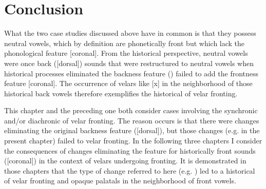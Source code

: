 \section{{Conclusion}}\label{sec:6.6}

What the two case studies discussed above have in common is that they possess neutral vowels, which by definition are phonetically front but which lack the phonological feature [coronal].  From the historical perspective, neutral vowels were once back ([dorsal]) sounds that were restructured to neutral vowels when historical processes eliminated the backness feature () failed to add the frontness feature [coronal]. The occurrence of velars like [x] in the neighborhood of those historical back vowels therefore exemplifies the historical  of velar fronting.

This chapter and the preceding one both consider cases involving the synchronic and/or diachronic  of velar fronting. The reason  occurs is that there were changes eliminating the original backness feature ([dorsal]), but those changes (e.g.  in the present chapter) failed to  velar fronting. In the following three chapters I consider the consequences of changes eliminating the feature for historically front sounds ([coronal]) in the context of velars undergoing fronting. It is demonstrated in those chapters that the type of change referred to here (e.g. ) led to a historical  of velar fronting and opaque palatals in the neighborhood of front vowels.
